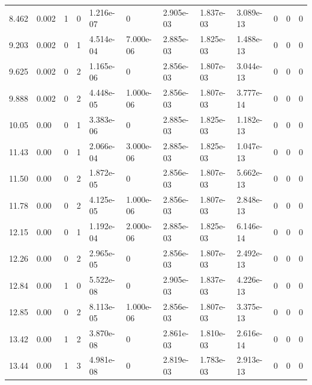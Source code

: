 \documentclass[preview]{standalone}
\begin{document}
{{\begin{tabular}{L{1.2cm}C{1.2cm} C{0.3cm}C{0.5cm} C{1.4cm}C{1.4cm} C{1.4cm}C{1.4cm} C{1.6cm}C{1.6cm} C{1.6cm}C{1.6cm}}
  8.462  &  0.002  & 1     &  0 &  1.216e-07  & 0  &  2.905e-03&   1.837e-03& 3.089e-13 & 0   &  0 & 0  \\ 
  9.203  &  0.002  & 0     &  1 &  4.514e-04  & 7.000e-06  &  2.885e-03&   1.825e-03& 1.488e-13 & 0   &  0 & 0  \\ 
  9.625  &  0.002  & 0     &  2 &  1.165e-06  & 0  &  2.856e-03&   1.807e-03& 3.044e-13 & 0   &  0 & 0  \\ 
  9.888  &  0.002  & 0     &  2 &  4.448e-05  & 1.000e-06  &  2.856e-03&   1.807e-03& 3.777e-14 & 0   &  0 & 0  \\ 
  10.05  &  0.00  & 0     &  1 &  3.383e-06  & 0  &  2.885e-03&   1.825e-03& 1.182e-13 & 0   &  0 & 0  \\ 
  11.43  &  0.00  & 0     &  1 &  2.066e-04  & 3.000e-06  &  2.885e-03&   1.825e-03& 1.047e-13 & 0   &  0 & 0  \\ 
  11.50  &  0.00  & 0     &  2 &  1.872e-05  & 0  &  2.856e-03&   1.807e-03& 5.662e-13 & 0   &  0 & 0  \\ 
  11.78  &  0.00  & 0     &  2 &  4.125e-05  & 1.000e-06  &  2.856e-03&   1.807e-03& 2.848e-13 & 0   &  0 & 0  \\ 
  12.15  &  0.00  & 0     &  1 &  1.192e-04  & 2.000e-06  &  2.885e-03&   1.825e-03& 6.146e-14 & 0   &  0 & 0  \\ 
  12.26  &  0.00  & 0     &  2 &  2.965e-05  & 0  &  2.856e-03&   1.807e-03& 2.492e-13 & 0   &  0 & 0  \\ 
  12.84  &  0.00  & 1     &  0 &  5.522e-08  & 0  &  2.905e-03&   1.837e-03& 4.226e-13 & 0   &  0 & 0  \\ 
  12.85  &  0.00  & 0     &  2 &  8.113e-05  & 1.000e-06  &  2.856e-03&   1.807e-03& 3.375e-13 & 0   &  0 & 0  \\ 
  13.42  &  0.00  & 1     &  2 &  3.870e-08  & 0  &  2.861e-03&   1.810e-03& 2.616e-14 & 0   &  0 & 0  \\ 
  13.44  &  0.00  & 1     &  3 &  4.981e-08  & 0  &  2.819e-03&   1.783e-03& 2.913e-13 & 0   &  0 & 0  \\ 
\hline 
\end{tabular} 

}}
\end{document}
